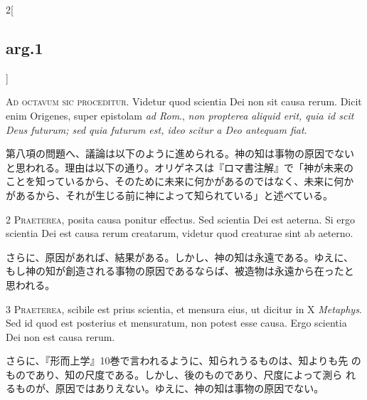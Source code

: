 \documentclass[paper=a4paper,fontsize=10pt,jafontsize=9pt,titlepage]{jlreq}
\begin{document}
\begin{paracol}{2}[\subsection{arg.1}]

{\huge A}{\scshape d octavum sic proceditur}. Videtur quod scientia
Dei non sit causa rerum. Dicit enim Origenes, super epistolam
{\itshape ad Rom}., {\itshape non propterea aliquid erit, quia id scit
Deus futurum; sed quia futurum est, ideo scitur a Deo antequam fiat}.

\switchcolumn

第八項の問題へ、議論は以下のように進められる。神の知は事物の原因でない
と思われる。理由は以下の通り。オリゲネスは『ロマ書注解』で「神が未来の
ことを知っているから、そのために未来に何かがあるのではなく、未来に何か
があるから、それが生じる前に神によって知られている」と述べている。


{\scshape 2 Praeterea}, posita causa ponitur effectus. Sed scientia
Dei est aeterna. Si ergo scientia Dei est causa rerum creatarum,
videtur quod creaturae sint ab aeterno.

\switchcolumn

さらに、原因があれば、結果がある。しかし、神の知は永遠である。ゆえに、
もし神の知が創造される事物の原因であるならば、被造物は永遠から在ったと
思われる。


{\scshape 3 Praeterea}, scibile est prius scientia, et mensura eius,
ut dicitur in X {\itshape Metaphys}. Sed id quod est posterius et
mensuratum, non potest esse causa. Ergo scientia Dei non est causa
rerum.

\switchcolumn

さらに、『形而上学』10巻で言われるように、知られうるものは、知よりも先
のものであり、知の尺度である。しかし、後のものであり、尺度によって測ら
れるものが、原因ではありえない。ゆえに、神の知は事物の原因でない。

\switchcolumn*[\subsection{s.c.}]


\end{paracol}
\end{document}
